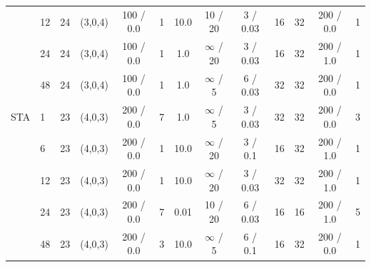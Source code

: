 \begin{table}[H]
{\begin{tabular}{llccccccccccc}
 & 12 & 24 & (3,0,4) & 100 / 0.0 & 1 & 10.0 & 10 / 20 & 3 / 0.03 & 16 & 32 & 200 / 0.0 & 1 \\
 & 24 & 24 & (3,0,4) & 100 / 0.0 & 1 & 1.0 & $\infty$ / 20 & 3 / 0.03 & 16 & 32 & 200 / 1.0 & 1 \\
 & 48 & 24 & (3,0,4) & 100 / 0.0 & 1 & 1.0 & $\infty$ / 5 & 6 / 0.03 & 32 & 32 & 200 / 0.0 & 1 \\
\midrule
STA & 1 & 23 & (4,0,3) & 200 / 0.0 & 7 & 1.0 & $\infty$ / 5 & 3 / 0.03 & 32 & 32 & 200 / 0.0 & 3 \\
 & 6 & 23 & (4,0,3) & 200 / 0.0 & 1 & 10.0 & $\infty$ / 20 & 3 / 0.1 & 16 & 32 & 200 / 1.0 & 1 \\
 & 12 & 23 & (4,0,3) & 200 / 0.0 & 1 & 10.0 & $\infty$ / 20 & 3 / 0.03 & 32 & 32 & 200 / 1.0 & 1 \\
 & 24 & 23 & (4,0,3) & 200 / 0.0 & 7 & 0.01 & 10 / 20 & 6 / 0.03 & 16 & 16 & 200 / 1.0 & 5 \\
 & 48 & 23 & (4,0,3) & 200 / 0.0 & 3 & 10.0 & $\infty$ / 5 & 6 / 0.1 & 16 & 32 & 200 / 0.0 & 1 \\
\bottomrule
\end{tabular}}
\end{table}
